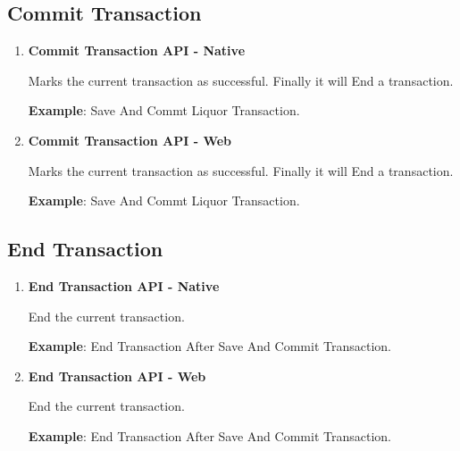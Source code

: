 	\subsection{Commit Transaction}
	
		\begin{enumerate}
	
			\item \small \textbf{Commit Transaction API - Native}
				

				\par
				Marks the current transaction as successful. Finally it will End a transaction.

				\par
					\textbf{Example}: Save And Commt Liquor Transaction.
						


			\item \small \textbf{Commit Transaction API - Web}
				

				\par
				Marks the current transaction as successful. Finally it will End a transaction.

				\par
					\textbf{Example}: Save And Commt Liquor Transaction.
						

		\end{enumerate}



	
	\subsection{End Transaction}

		\begin{enumerate}

			\item \small \textbf{End Transaction API - Native}
				

				\par
					End the current transaction.

				\par
					\textbf{Example}: End Transaction After Save And Commit Transaction.
						


			\item \small \textbf{End Transaction API - Web}
				

				\par
					End the current transaction.

				\par
					\textbf{Example}: End Transaction After Save And Commit Transaction.
						

		\end{enumerate}



